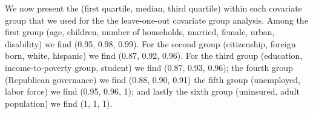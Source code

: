 \documentclass[12pt]{article}
\begin{document}
We now present the (first quartile, median, third quartile) within each covariate group that we used for the the leave-one-out covariate group analysis. Among the first group (age, children, number of households, married, female, urban, disability) we find (0.95, 0.98, 0.99). For the second group (citizenship, foreign born, white, hispanic) we find (0.87, 0.92, 0.96). For the third group (education, income-to-poverty group, student) we find (0.87, 0.93, 0.96); the fourth group (Republican governance) we find (0.88, 0.90, 0.91) the fifth group (unemployed, labor force) we find (0.95, 0.96, 1); and lastly the sixth group (uninsured, adult population) we find (1, 1, 1).
\end{document}
